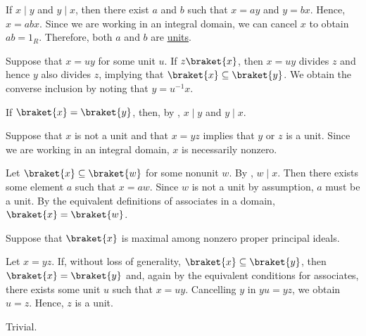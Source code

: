 \begin{defproof}
   If \( x \mid y \) and \( y \mid x \), then there exist \( a \) and \( b \) such that \( x = ay \) and \( y = bx \). Hence, \( x = abx \). Since we are working in an integral domain, we can cancel \( x \) to obtain \( ab = 1_R \). Therefore, both \( a \) and \( b \) are \hyperref[def:divisibility/unit]{units}.

   Suppose that \( x = uy \) for some unit \( u \). If \( z \braket{ x } \), then \( x = uy \) divides \( z \) and hence \( y \) also divides \( z \), implying that \( \braket{ x } \subseteq \braket{ y } \). We obtain the converse inclusion by noting that \( y = u^{-1} x \).

   If \( \braket{ x } = \braket{ y } \), then, by , \( x \mid y \) and \( y \mid x \).

   Suppose that \( x \) is not a unit and that \( x = yz \) implies that \( y \) or \( z \) is a unit. Since we are working in an integral domain, \( x \) is necessarily nonzero.

  Let \( \braket{ x } \subseteq \braket{ w } \) for some nonunit \( w \). By , \( w \mid x \). Then there exists some element \( a \) such that \( x = aw \). Since \( w \) is not a unit by assumption, \( a \) must be a unit. By the equivalent definitions of associates in a domain, \( \braket{ x } = \braket{ w } \).

   Suppose that \( \braket{ x } \) is maximal among nonzero proper principal ideals.

  Let \( x = yz \). If, without loss of generality, \( \braket{ x } \subseteq \braket{ y } \), then \( \braket{ x } = \braket{ y } \) and, again by the equivalent conditions for associates, there exists some unit \( u \) such that \( x = uy \). Cancelling \( y \) in \( yu = yz \), we obtain \( u = z \). Hence, \( z \) is a unit.

   Trivial.
\end{defproof}

